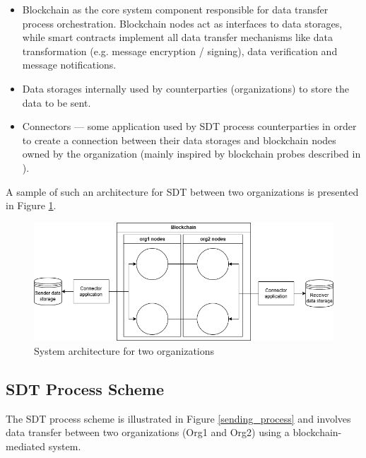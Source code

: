 \documentclass[10pt]{llncs}
\begin{document}
\begin{itemize}
    \item Blockchain as the core system component responsible for data transfer process orchestration. 
    Blockchain nodes act as interfaces to data storages, while smart contracts implement all data transfer mechanisms like
    data transformation (e.g. message encryption / signing), data verification and message notifications. 
    \item Data storages internally used by counterparties (organizations) to store the data to be sent.
    \item Connectors --- some application used by SDT process counterparties in order to create a connection between their data storages
    and blockchain nodes owned by the organization (mainly inspired by blockchain probes described in \cite{Jia2023}).
\end{itemize}

A sample of such an architecture for SDT between two organizations is presented in Figure \ref{system_architecture}.

\begin{figure}
    \includegraphics[width=\textwidth]{system_architecture.png}
    \caption{System architecture for two organizations} \label{system_architecture}
\end{figure}

\subsection{SDT Process Scheme}

The SDT process scheme is illustrated in Figure \ref{sending_process} and involves data transfer between two organizations (Org1 and Org2) using a blockchain-mediated system. 
\end{document}

